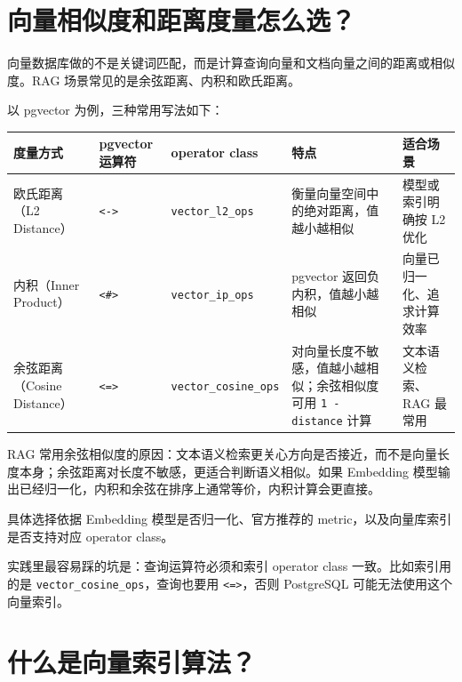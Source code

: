 \documentclass[9pt,a4paper,twocolumn]{ctexart}
\begin{document}
\section*{向量相似度和距离度量怎么选？}


向量数据库做的不是关键词匹配，而是计算查询向量和文档向量之间的距离或相似度。RAG 场景常见的是余弦距离、内积和欧氏距离。



以 pgvector 为例，三种常用写法如下：


{\footnotesize
\begin{tabular}{|p{}|p{}|p{}|p{}|p{}|}
\hline
\textbf{度量方式} & \textbf{pgvector 运算符} & \textbf{operator class} & \textbf{特点} & \textbf{适合场景} \\
\hline
欧氏距离（L2 Distance） & \texttt{<->} & \texttt{vector\_l2\_ops} & 衡量向量空间中的绝对距离，值越小越相似 & 模型或索引明确按 L2 优化 \\
\hline
内积（Inner Product） & \texttt{<\#>} & \texttt{vector\_ip\_ops} & pgvector 返回负内积，值越小越相似 & 向量已归一化、追求计算效率 \\
\hline
余弦距离（Cosine Distance） & \texttt{<=>} & \texttt{vector\_cosine\_ops} & 对向量长度不敏感，值越小越相似；余弦相似度可用 \texttt{1 - distance} 计算 & 文本语义检索、RAG 最常用 \\
\hline
\end{tabular}
}



RAG 常用余弦相似度的原因：文本语义检索更关心方向是否接近，而不是向量长度本身；余弦距离对长度不敏感，更适合判断语义相似。如果 Embedding 模型输出已经归一化，内积和余弦在排序上通常等价，内积计算会更直接。



具体选择依据 Embedding 模型是否归一化、官方推荐的 metric，以及向量库索引是否支持对应 operator class。



实践里最容易踩的坑是：查询运算符必须和索引 operator class 一致。比如索引用的是 \texttt{vector\_cosine\_ops}，查询也要用 \texttt{<=>}，否则 PostgreSQL 可能无法使用这个向量索引。



\section*{什么是向量索引算法？}
\end{document}
